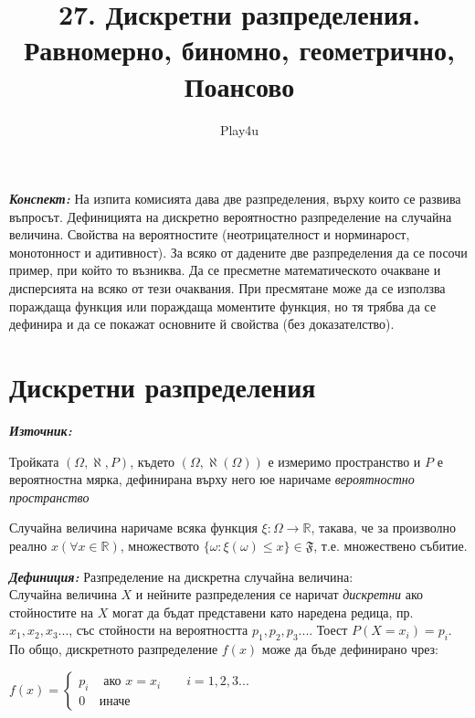 \documentclass[11pt]{article} %
\title{27. Дискретни разпределения. Равномерно, биномно, геометрично, Поансово}
\author{Play4u}
\newcommand{\italicBold}[1]{\textbf{\emph{#1}}}
\newcommand{\definition}{\italicBold{Дефиниция: }}
\newcommand{\source}{\italicBold{Източник: }}
\newcommand{\curlies}[1]{\{#1\}}
\begin{document}
\maketitle

\italicBold{Конспект: } На изпита комисията дава две разпределения, върху които се развива въпросът. Дефиницията на дискретно вероятностно разпределение на случайна величина. Свойства на вероятностите (неотрицателност и норминарост, монотонност и адитивност). За всяко от дадените две разпределения да се посочи пример, при който то възниква. Да се пресметне математическото очакване и дисперсията на всяко от тези очаквания. При пресмятане може да се използва пораждаща функция или пораждаща моментите функция, но тя трябва да се дефинира и да се покажат основните й свойства (без доказателство).


\section{Дискретни разпределения}
\source {}\\\par

Тройката $(\Omega, \aleph, P)$, където $(\Omega, \aleph(\Omega))$ е измеримо пространство и $P$ е вероятностна мярка, дефинирана върху него юе наричаме \textit{вероятностно пространство}\\\par

Случайна величина наричаме всяка функция $\xi : \Omega \to \mathbb{R}$, такава, че за произволно реално $x(\forall x \in \mathbb{R})$, множеството $\curlies{\omega:\xi(\omega)\leq x}\in \mathfrak{F}$, т.е. множествено събитие.\\\par

\definition Разпределение на дискретна случайна величина:\\
Случайна величина $X$ и нейните разпределения се наричат \textit{дискретни} ако стойностите на $X$ могат да бъдат представени като наредена редица, пр. $x_{1}, x_{2}, x_{3}...$, със стойности на вероятността $p_{1}, p_{2}, p_{3}...$. Тоест $P(X=x_{i})=p_{i}$. По общо, дискретното разпределение $f(x)$ може да бъде дефинирано чрез:\\
\centerline{$f(x)=
\begin{cases} 
      p_{i} & \text{ ако } x=x_{i} \qquad i = 1,2,3... \\
      0 & \text{иначе}
\end{cases}$}
\end{document}
